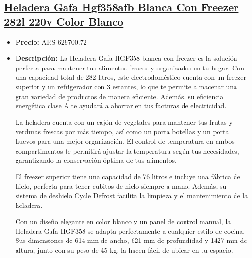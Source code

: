 \documentclass{article}
\begin{document}
\begin{adjustwidth}{2em}{}

\subsection{\uline{\href{https://www.mercadolibre.com.ar/heladera-gafa-hgf358afb-blanca-con-freezer-282l-220v-color-blanco/p/MLA19710493}{Heladera Gafa Hgf358afb Blanca Con Freezer 282l 220v Color Blanco}}}
\begin{itemize}
    \item \textbf{Precio:} ARS 629700.72
    \item \textbf{Descripción:} La Heladera Gafa HGF358 blanca con freezer es la solución perfecta para mantener tus alimentos frescos y organizados en tu hogar. Con una capacidad total de 282 litros, este electrodoméstico cuenta con un freezer superior y un refrigerador con 3 estantes, lo que te permite almacenar una gran variedad de productos de manera eficiente. Además, su eficiencia energética clase A te ayudará a ahorrar en tus facturas de electricidad.

La heladera cuenta con un cajón de vegetales para mantener tus frutas y verduras frescas por más tiempo, así como un porta botellas y un porta huevos para una mejor organización. El control de temperatura en ambos compartimentos te permitirá ajustar la temperatura según tus necesidades, garantizando la conservación óptima de tus alimentos.

El freezer superior tiene una capacidad de 76 litros e incluye una fábrica de hielo, perfecta para tener cubitos de hielo siempre a mano. Además, su sistema de deshielo Cycle Defrost facilita la limpieza y el mantenimiento de la heladera.

Con un diseño elegante en color blanco y un panel de control manual, la Heladera Gafa HGF358 se adapta perfectamente a cualquier estilo de cocina. Sus dimensiones de 614 mm de ancho, 621 mm de profundidad y 1427 mm de altura, junto con su peso de 45 kg, la hacen fácil de ubicar en tu espacio.


\end{itemize}
\end{adjustwidth}
\end{document}
